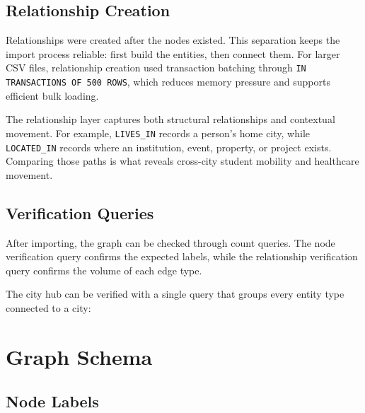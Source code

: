 ﻿\documentclass[11pt,a4paper]{article}
\begin{document}
\subsection{Relationship Creation}

Relationships were created after the nodes existed. This separation keeps the import process reliable: first build the entities, then connect them. For larger CSV files, relationship creation used transaction batching through \texttt{IN TRANSACTIONS OF 500 ROWS}, which reduces memory pressure and supports efficient bulk loading.

The relationship layer captures both structural relationships and contextual movement. For example, \texttt{LIVES\_IN} records a person's home city, while \texttt{LOCATED\_IN} records where an institution, event, property, or project exists. Comparing those paths is what reveals cross-city student mobility and healthcare movement.

\subsection{Verification Queries}

After importing, the graph can be checked through count queries. The node verification query confirms the expected labels, while the relationship verification query confirms the volume of each edge type.

The city hub can be verified with a single query that groups every entity type connected to a city:
\section{Graph Schema}

\subsection{Node Labels}
\end{document}
